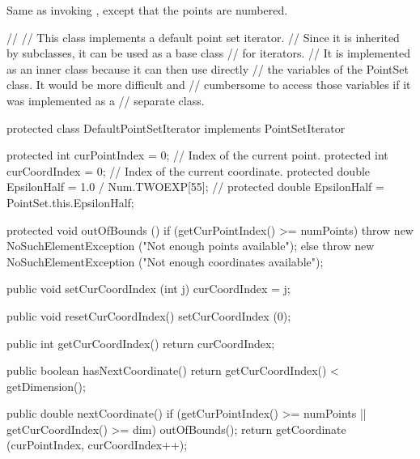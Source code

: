 \begin{tabb}
   Same as invoking , except that the points are numbered.
\end{tabb}
\begin{htmlonly}
\end{htmlonly}

\begin{code}\begin{hide}


// %
// This class implements a default point set iterator.
// Since it is inherited by subclasses, it can be used as a base class
// for iterators.
// It is implemented as an inner class because it can then use directly
// the variables of the PointSet class.  It would be more difficult and
// cumbersome to access those variables if it was implemented as a
// separate class.

   protected class DefaultPointSetIterator implements PointSetIterator {

      protected int curPointIndex = 0;      // Index of the current point.
      protected int curCoordIndex = 0;      // Index of the current coordinate.
      protected double EpsilonHalf = 1.0 / Num.TWOEXP[55];
   // protected double EpsilonHalf = PointSet.this.EpsilonHalf;

      protected void outOfBounds () {
         if (getCurPointIndex() >= numPoints)
            throw new NoSuchElementException ("Not enough points available");
         else
            throw new NoSuchElementException ("Not enough coordinates available");
      }

      public void setCurCoordIndex (int j) {
         curCoordIndex = j;
      }

      public void resetCurCoordIndex() {
         setCurCoordIndex (0);
      }

      public int getCurCoordIndex() {
        return curCoordIndex;
      }

      public boolean hasNextCoordinate() {
        return getCurCoordIndex() < getDimension();
      }

      public double nextCoordinate() {
         if (getCurPointIndex() >= numPoints || getCurCoordIndex() >= dim)
            outOfBounds();
         return getCoordinate (curPointIndex, curCoordIndex++);
      }

}
\end{hide}
\end{code}
